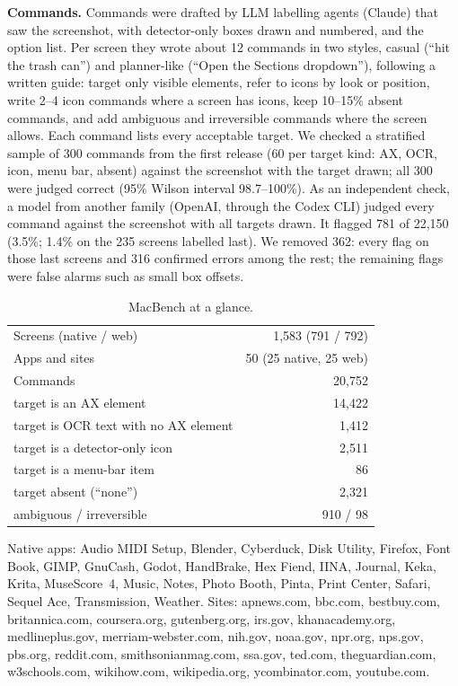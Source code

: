 \documentclass[a4paper,twoside]{article}
\newcommand{\bench}{MacBench}
\begin{document}
\textbf{Commands.} Commands were drafted by LLM labelling agents (Claude) that saw the screenshot, with detector-only boxes drawn and numbered, and the option list. Per screen they wrote about 12 commands in two styles, casual (``hit the trash can'') and planner-like (``Open the Sections dropdown''), following a written guide: target only visible elements, refer to icons by look or position, write 2--4 icon commands where a screen has icons, keep 10--15\% absent commands, and add ambiguous and irreversible commands where the screen allows. Each command lists every acceptable target. We checked a stratified sample of 300 commands from the first release (60 per target kind: AX, OCR, icon, menu bar, absent) against the screenshot with the target drawn; all 300 were judged correct (95\% Wilson interval 98.7--100\%). As an independent check, a model from another family (OpenAI, through the Codex CLI) judged every command against the screenshot with all targets drawn. It flagged 781 of 22,150 (3.5\%; 1.4\% on the 235 screens labelled last). We removed 362: every flag on those last screens and 316 confirmed errors among the rest; the remaining flags were false alarms such as small box offsets.

\begin{table}[t]
\caption{\bench{} at a glance.}
\label{tab:stats}
\centering
\small
\begin{tabular}{@{}lr@{}}
\toprule
Screens (native / web) & 1,583 (791 / 792) \\
Apps and sites & 50 (25 native, 25 web) \\
Commands & 20,752 \\
\quad target is an AX element & 14,422 \\
\quad target is OCR text with no AX element & 1,412 \\
\quad target is a detector-only icon & 2,511 \\
\quad target is a menu-bar item & 86 \\
\quad target absent (``none'') & 2,321 \\
\quad ambiguous / irreversible & 910 / 98 \\
\bottomrule
\end{tabular}

\vspace{2pt}
\begin{minipage}{0.95\textwidth}\footnotesize Native apps: Audio MIDI Setup, Blender, Cyberduck, Disk Utility, Firefox, Font Book, GIMP, GnuCash, Godot, HandBrake, Hex Fiend, IINA, Journal, Keka, Krita, MuseScore~4, Music, Notes, Photo Booth, Pinta, Print Center, Safari, Sequel Ace, Transmission, Weather. Sites: apnews.com, bbc.com, bestbuy.com, britannica.com, coursera.org, gutenberg.org, irs.gov, khanacademy.org, medlineplus.gov, merriam-webster.com, nih.gov, noaa.gov, npr.org, nps.gov, pbs.org, reddit.com, smithsonianmag.com, ssa.gov, ted.com, theguardian.com, w3schools.com, wikihow.com, wikipedia.org, ycombinator.com, youtube.com.\end{minipage}
\end{table}
\end{document}
